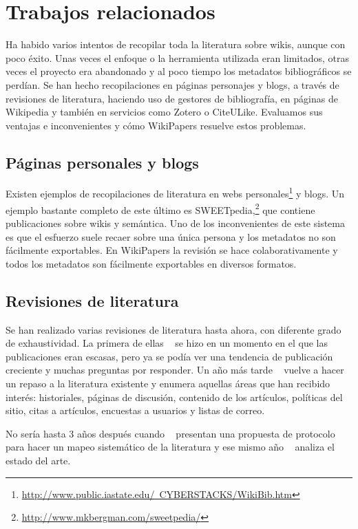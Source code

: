 \documentclass[11pt,twocolumn]{article}
\begin{document}
\section{Trabajos relacionados}
Ha habido varios intentos de recopilar toda la literatura sobre wikis, aunque con poco éxito. Unas veces el enfoque o la herramienta utilizada eran limitados, otras veces el proyecto era abandonado y al poco tiempo los metadatos bibliográficos se perdían. Se han hecho recopilaciones en páginas personajes y blogs, a través de revisiones de literatura, haciendo uso de gestores de bibliografía, en páginas de Wikipedia y también en servicios como Zotero o CiteULike. Evaluamos sus ventajas e inconvenientes y cómo WikiPapers resuelve estos problemas.

\subsection{Páginas personales y blogs}
Existen ejemplos de recopilaciones de literatura en webs personales\footnote{\href{http://www.public.iastate.edu/~CYBERSTACKS/WikiBib.htm}{http://www.public.iastate.edu/~CYBERSTACKS/WikiBib.htm}} y blogs. Un ejemplo bastante completo de este último es SWEETpedia,\footnote{\href{http://www.mkbergman.com/sweetpedia/}{http://www.mkbergman.com/sweetpedia/}} que contiene publicaciones sobre wikis y semántica. Uno de los inconvenientes de este sistema es que el esfuerzo suele recaer sobre una única persona y los metadatos no son fácilmente exportables. En WikiPapers la revisión se hace colaborativamente y todos los metadatos son fácilmente exportables en diversos formatos.

\subsection{Revisiones de literatura}
Se han realizado varias revisiones de literatura hasta ahora, con diferente grado de exhaustividad. La primera de ellas ~\citep{voss2005} se hizo en un momento en el que las publicaciones eran escasas, pero ya se podía ver una tendencia de publicación creciente y muchas preguntas por responder. Un año más tarde ~\citep{ayers2006} vuelve a hacer un repaso a la literatura existente y enumera aquellas áreas que han recibido interés: historiales, páginas de discusión, contenido de los artículos, políticas del sitio, citas a artículos, encuestas a usuarios y listas de correo.

No sería hasta 3 años después cuando ~\citep{okoli2009b} presentan una propuesta de protocolo para hacer un mapeo sistemático de la literatura y ese mismo año ~\citep{okoli2009} analiza el estado del arte.
\end{document}
